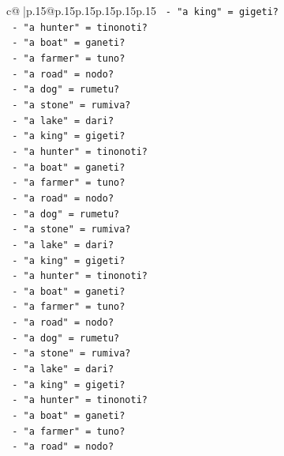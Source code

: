 \documentclass{article}
\begin{document}
{\begin{supertabular}{c@{$\;$}|p{.15\linewidth}@{}p{.15\linewidth}p{.15\linewidth}p{.15\linewidth}p{.15\linewidth}p{.15\linewidth}}
{{{\texttt{                {-} "a king" = gigeti?} \\
\texttt{                {-} "a hunter" = tinonoti?} \\
\texttt{                {-} "a boat" = ganeti?} \\
\texttt{                {-} "a farmer" = tuno?} \\
\texttt{                {-} "a road" = nodo?} \\
\texttt{                {-} "a dog" = rumetu?} \\
\texttt{                {-} "a stone" = rumiva?} \\
\texttt{                {-} "a lake" = dari?} \\
\texttt{                {-} "a king" = gigeti?} \\
\texttt{                {-} "a hunter" = tinonoti?} \\
\texttt{                {-} "a boat" = ganeti?} \\
\texttt{                {-} "a farmer" = tuno?} \\
\texttt{                {-} "a road" = nodo?} \\
\texttt{                {-} "a dog" = rumetu?} \\
\texttt{                {-} "a stone" = rumiva?} \\
\texttt{                {-} "a lake" = dari?} \\
\texttt{                {-} "a king" = gigeti?} \\
\texttt{                {-} "a hunter" = tinonoti?} \\
\texttt{                {-} "a boat" = ganeti?} \\
\texttt{                {-} "a farmer" = tuno?} \\
\texttt{                {-} "a road" = nodo?} \\
\texttt{                {-} "a dog" = rumetu?} \\
\texttt{                {-} "a stone" = rumiva?} \\
\texttt{                {-} "a lake" = dari?} \\
\texttt{                {-} "a king" = gigeti?} \\
\texttt{                {-} "a hunter" = tinonoti?} \\
\texttt{                {-} "a boat" = ganeti?} \\
\texttt{                {-} "a farmer" = tuno?} \\
\texttt{                {-} "a road" = nodo?} \\
}}}
\end{supertabular}}
\end{document}
